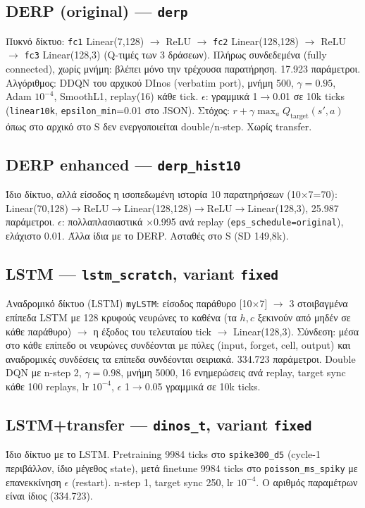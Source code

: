 \documentclass[10pt,a4paper]{article}
\begin{document}
\subsection{DERP (original) --- \texttt{derp}}
Πυκνό δίκτυο: \texttt{fc1} Linear(7,128) $\to$ ReLU $\to$ \texttt{fc2} Linear(128,128) $\to$ ReLU $\to$ \texttt{fc3} Linear(128,3) (Q-τιμές των 3 δράσεων). Πλήρως συνδεδεμένα (fully connected), χωρίς μνήμη: βλέπει μόνο την τρέχουσα παρατήρηση. 17.923 παράμετροι. Αλγόριθμος: DDQN του αρχικού DInos (verbatim port), μνήμη 500, $\gamma=0.95$, Adam $10^{-4}$, SmoothL1, replay(16) κάθε tick. $\epsilon$: γραμμικά 1$\to$0.01 σε 10k ticks (\texttt{linear10k}, \texttt{epsilon\_min}=0.01 στο JSON). Στόχος: $r+\gamma\max_a Q_{\text{target}}(s',a)$ όπως στο αρχικό\textperiodcentered{} στο S δεν ενεργοποιείται double/n-step. Χωρίς transfer.

\subsection{DERP enhanced --- \texttt{derp\_hist10}}
Ίδιο δίκτυο, αλλά είσοδος η ισοπεδωμένη ιστορία 10 παρατηρήσεων (10$\times$7=70): Linear(70,128)$\to$ReLU$\to$Linear(128,128)$\to$ReLU$\to$Linear(128,3), 25.987 παράμετροι. $\epsilon$: πολλαπλασιαστικά $\times$0.995 ανά replay (\texttt{eps\_schedule=original}), ελάχιστο 0.01. Άλλα ίδια με το DERP. Ασταθές στο S (SD 149,8k).

\subsection{LSTM --- \texttt{lstm\_scratch}, variant \texttt{fixed}}
Αναδρομικό δίκτυο (LSTM) \texttt{myLSTM}: είσοδος παράθυρο [10$\times$7] $\to$ 3 στοιβαγμένα επίπεδα LSTM με 128 κρυφούς νευρώνες το καθένα (τα $h,c$ ξεκινούν από μηδέν σε κάθε παράθυρο) $\to$ η έξοδος του τελευταίου tick $\to$ Linear(128,3). Σύνδεση: μέσα στο κάθε επίπεδο οι νευρώνες συνδέονται με πύλες (input, forget, cell, output) και αναδρομικές συνδέσεις\textperiodcentered{} τα επίπεδα συνδέονται σειριακά. 334.723 παράμετροι. Double DQN με n-step 2, $\gamma=0.98$, μνήμη 5000, 16 ενημερώσεις ανά replay, target sync κάθε 100 replays, lr $10^{-4}$, $\epsilon$ 1$\to$0.05 γραμμικά σε 10k ticks.

\subsection{LSTM+transfer --- \texttt{dinos\_t}, variant \texttt{fixed}}
Ίδιο δίκτυο με το LSTM. Pretraining 9984 ticks στο \texttt{spike300\_d5} (cycle-1 περιβάλλον, ίδιο μέγεθος state), μετά finetune 9984 ticks στο \texttt{poisson\_ms\_spiky} με επανεκκίνηση $\epsilon$ (restart). n-step 1, target sync 250, lr $10^{-4}$. Ο αριθμός παραμέτρων είναι ίδιος (334.723).
\end{document}
